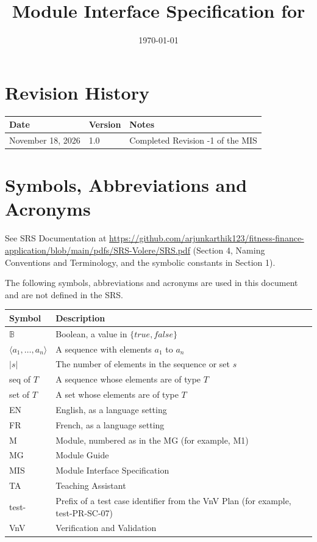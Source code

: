 \documentclass[12pt, titlepage]{article}
\begin{document}
\title{Module Interface Specification for \progname{}}

\author{\authname}

\date{\today}

\maketitle


\section{Revision History}

\begin{tabularx}{\textwidth}{p{3cm}p{2cm}X}
\toprule {\bf Date} & {\bf Version} & {\bf Notes}\\
\midrule
November 18, 2026 & 1.0 & Completed Revision -1 of the MIS\\
\bottomrule
\end{tabularx}

\section{Symbols, Abbreviations and Acronyms}

See SRS Documentation at
\url{https://github.com/arjunkarthik123/fitness-finance-application/blob/main/pdfs/SRS-Volere/SRS.pdf}
(Section 4, Naming Conventions and Terminology, and the symbolic constants in
Section 1).

The following symbols, abbreviations and acronyms are used in this document
and are not defined in the SRS.

\begin{center}
\renewcommand{\arraystretch}{1.2}
\begin{tabular}{l p{}}
\toprule
\textbf{Symbol} & \textbf{Description}\\
\midrule
$\mathbb{B}$ & Boolean, a value in $\{\mathit{true}, \mathit{false}\}$\\
$\langle a_1, \ldots, a_n \rangle$ & A sequence with elements $a_1$ to $a_n$\\
$|s|$ & The number of elements in the sequence or set $s$\\
seq of $T$ & A sequence whose elements are of type $T$\\
set of $T$ & A set whose elements are of type $T$\\
EN & English, as a language setting\\
FR & French, as a language setting\\
M & Module, numbered as in the MG (for example, M1)\\
MG & Module Guide\\
MIS & Module Interface Specification\\
TA & Teaching Assistant\\
test- & Prefix of a test case identifier from the VnV Plan (for example,
test-PR-SC-07)\\
VnV & Verification and Validation\\
\bottomrule
\end{tabular}
\end{center}
\end{document}

